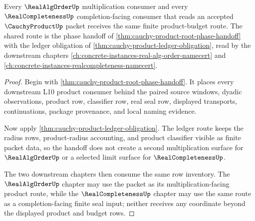 \begin{theorem}
\label{thm:cauchy-product-realalgorder-completion-handoff}
Every $\RealAlgOrderUp$ multiplication consumer and every $\RealCompletenessUp$ completion-facing consumer that reads an accepted $\CauchyProductUp$ packet receives the same finite product-budget route. The shared route is the phase handoff of \autoref{thm:cauchy-product-root-phase-handoff} with the ledger obligation of \autoref{thm:cauchy-product-ledger-obligation}, read by the downstream chapters \autoref{ch:concrete-instances-real-alg-order-namecert} and \autoref{ch:concrete-instances-realcompleteness-namecert}.
\end{theorem}
\begin{proof}
Begin with \autoref{thm:cauchy-product-root-phase-handoff}. It places every downstream L10 product consumer behind the paired source windows, dyadic observations, product row, classifier row, real seal row, displayed transports, continuations, package provenance, and local naming evidence.

Now apply \autoref{thm:cauchy-product-ledger-obligation}. The ledger route keeps the radius rows, product-radius accounting, and product classifier visible as finite packet data, so the handoff does not create a second multiplication surface for $\RealAlgOrderUp$ or a selected limit surface for $\RealCompletenessUp$.

The two downstream chapters then consume the same row inventory. The $\RealAlgOrderUp$ chapter may use the packet as its multiplication-facing product route, while the $\RealCompletenessUp$ chapter may use the same route as a completion-facing finite seal input; neither receives any coordinate beyond the displayed product and budget rows.
\end{proof}

